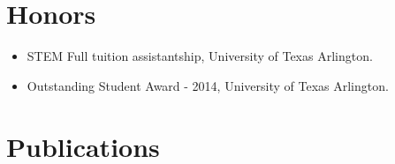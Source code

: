 \documentclass{my_cv}
\begin{document}
\section{{Honors}} 

\vspace{-5pt} %
\begin{itemize} \itemsep -2pt 
\item STEM Full tuition assistantship, University of Texas Arlington. \\
\item Outstanding Student Award - 2014, University of Texas Arlington. \\
\end{itemize}

\vspace{-7mm}  %


\section{{Publications}} 
\vspace{-5pt} 
\printbibliography[title={Articles},type=article,heading=subbibliography]
\vspace{-6mm}
\printbibliography[title={Conference Publications},type=inproceedings,heading=subbibliography]


\let\thefootnote\relax{}
\end{document}
